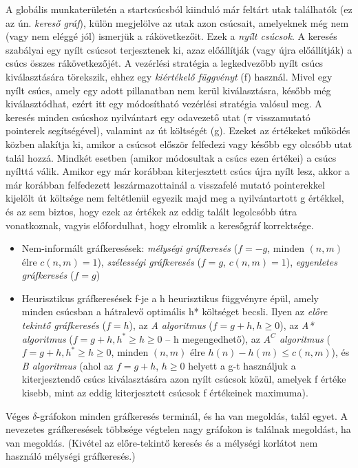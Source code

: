 \documentclass[margin=0px]{article}
\begin{document}
	A globális munkaterületén a startcsúcsból kiinduló már feltárt utak találhatók (ez az ún. \textit{kereső gráf}), külön megjelölve az utak azon csúcsait, amelyeknek még nem (vagy nem eléggé jól) ismerjük a rákövetkezőit. Ezek a \textit{nyílt csúcsok}. A keresés szabályai egy nyílt csúcsot terjesztenek ki, azaz előállítják (vagy újra előállítják) a csúcs összes rákövetkezőjét. A vezérlési stratégia a legkedvezőbb nyílt csúcs kiválasztására törekszik, ehhez egy \textit{kiértékelő függvényt} (f) használ. Mivel egy nyílt csúcs, amely egy adott pillanatban nem kerül kiválasztásra, később még kiválasztódhat, ezért itt egy módosítható vezérlési stratégia valósul meg.
	A keresés minden csúcshoz nyilvántart egy odavezető utat (\textbf{$\pi$} visszamutató pointerek segítségével), valamint az út költségét (g). Ezeket az értékeket működés közben alakítja ki, amikor a csúcsot először felfedezi vagy később egy olcsóbb utat talál hozzá. Mindkét esetben (amikor módosultak a csúcs ezen értékei) a csúcs nyílttá válik. Amikor egy már korábban kiterjesztett csúcs újra nyílt lesz, akkor a már korábban felfedezett leszármazottainál a visszafelé mutató pointerekkel kijelölt út költsége nem feltétlenül egyezik majd meg a nyilvántartott g értékkel, és az sem biztos, hogy ezek az értékek az eddig talált legolcsóbb útra vonatkoznak, vagyis előfordulhat, hogy elromlik a keresőgráf korrektsége.	
	\begin{itemize}
		\item Nem-informált gráfkeresések: \textit{mélységi gráfkeresés} ($f = -g$, minden $(n,m)$ élre $c(n,m)=1$), \textit{szélességi gráfkeresés} ($f = g$, $c(n,m)=1$), \textit{egyenletes gráfkeresés} ($f = g$)
		\item Heurisztikus gráfkeresések f-je a h heurisztikus függvényre épül, amely minden csúcsban a hátralevő optimális h* költséget becsli. Ilyen az \textit{előre tekintő gráfkeresés} ($f = h$), az \textit{A algoritmus} ($f = g+h, h \geq 0$), az \textit{A* algoritmus} ($f = g+h, h^* \geq h \geq 0$ – h megengedhető), az \textit{$A^C$ algoritmus} ($f = g+h, h^* \geq h \geq 0$, minden $(n,m)$ élre $h(n)-h(m) \leq c(n,m)$), és \textit{B algoritmus} (ahol az $f= g+h$, $h \geq 0$ helyett a g-t használjuk a kiterjesztendő csúcs kiválasztására azon nyílt csúcsok közül, amelyek f értéke kisebb, mint az eddig kiterjesztett csúcsok f értékeinek maximuma).
	\end{itemize}
	Véges $\delta$-gráfokon minden gráfkeresés terminál, és ha van megoldás, talál egyet. A nevezetes gráfkeresések többsége végtelen nagy gráfokon is találnak megoldást, ha van megoldás. (Kivétel az előre-tekintő keresés és a mélységi korlátot nem használó mélységi gráfkeresés.)
\end{document}
